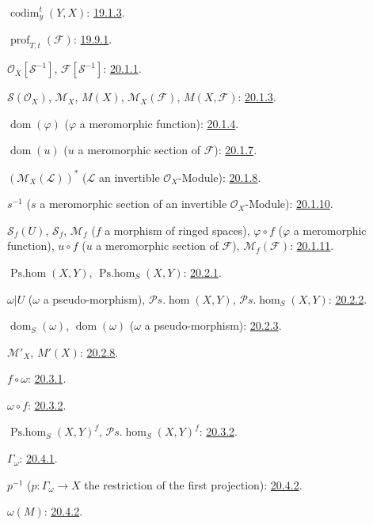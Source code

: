$\operatorname{codim}^{t}_{y}(Y,X)$: {\hyperref[IV.19.1.3]{19.1.3}}.

$\operatorname{prof}_{T,t}(\mathcal F)$: {\hyperref[IV.19.9.1]{19.9.1}}.

$\mathcal O_X[\mathcal S^{-1}]$, $\mathcal F[\mathcal S^{-1}]$:
{\hyperref[IV.20]{20.1.1}}.

$\mathcal S(\mathcal O_X)$, $\mathcal M_X$, $M(X)$,
$\mathcal M_X(\mathcal F)$, $M(X,\mathcal F)$:
{\hyperref[IV.20]{20.1.3}}.

$\operatorname{dom}(\varphi)$ ($\varphi$ a meromorphic function):
{\hyperref[IV.20]{20.1.4}}.

$\operatorname{dom}(u)$ ($u$ a meromorphic section of $\mathcal F$):
{\hyperref[IV.20]{20.1.7}}.

$(\mathcal M_X(\mathcal L))^{*}$
($\mathcal L$ an invertible $\mathcal O_X$-Module):
{\hyperref[IV.20]{20.1.8}}.

$s^{-1}$ ($s$ a meromorphic section of an invertible
$\mathcal O_X$-Module): {\hyperref[IV.20.1.10]{20.1.10}}.

$\mathcal S_f(U)$, $\mathcal S_f$, $\mathcal M_f$
($f$ a morphism of ringed spaces), $\varphi\circ f$ ($\varphi$ a
meromorphic function), $u\circ f$ ($u$ a meromorphic section of
$\mathcal F$), $\mathcal M_f(\mathcal F)$: {\hyperref[IV.20]{20.1.11}}.

$\operatorname{Ps.hom}(X,Y)$, $\operatorname{Ps.hom}_S(X,Y)$:
{\hyperref[IV.20]{20.2.1}}.

$\omega|U$ ($\omega$ a pseudo-morphism),
$\mathcal P\!s.\operatorname{hom}(X,Y)$,
$\mathcal P\!s.\operatorname{hom}_S(X,Y)$:
{\hyperref[IV.20]{20.2.2}}.

$\operatorname{dom}_S(\omega)$, $\operatorname{dom}(\omega)$
($\omega$ a pseudo-morphism): {\hyperref[IV.20]{20.2.3}}.

$\mathcal M'_X$, $M'(X)$: {\hyperref[IV.20]{20.2.8}}.

$f\circ\omega$: {\hyperref[IV.20]{20.3.1}}.

$\omega\circ f$: {\hyperref[IV.20]{20.3.2}}.

$\operatorname{Ps.hom}_S(X,Y)^f$,
$\mathcal P\!s.\operatorname{hom}_S(X,Y)^f$: {\hyperref[IV.20]{20.3.2}}.

$\Gamma_\omega$: {\hyperref[IV.20]{20.4.1}}.

$p^{-1}$ ($p:\Gamma_\omega\to X$ the restriction of the first
projection): {\hyperref[IV.20.4.2]{20.4.2}}.

$\omega(M)$: {\hyperref[IV.20.4.2]{20.4.2}}.

